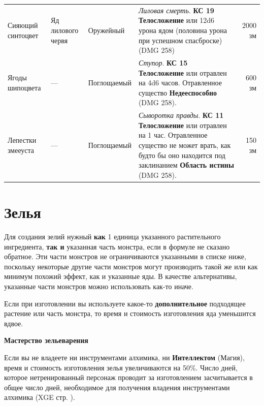 \documentclass[a4paper, 9pt, twocolumn]{book}
\newenvironment {dndtable}
{
		\bigskip
		\centering
		\begin{tcolorbox}
			[enhanced, 
			sharp corners,
			colback=framecolor, 
			boxrule = 0pt, 
			overlay={
				\begin{tcbinvclipframe}
					\path[fill=black] ([xshift=10pt,yshift=7pt]frame.north west) --
					(frame.north west) --
					(frame.north east) --
					([xshift=-10pt, yshift=7pt]frame.north east) --
					([xshift=-10pt, yshift=2pt]frame.north east) --
					([xshift=10pt,yshift=2pt]frame.north west) -- cycle;
					
					\path[fill=black] ([xshift=10pt,yshift=-7pt]frame.south west) --
					(frame.south west) --
					(frame.south east) --
					([xshift=-10pt, yshift=-7pt]frame.south east) --
					([xshift=-10pt, yshift=-2pt]frame.south east) --
					([xshift=10pt,yshift=-2pt]frame.south west) -- cycle;
				\end{tcbinvclipframe}
			}
			]}
{\end{tcolorbox}}
\begin{document}
\begin{table}[H]
\begin{tabularx}{\linewidth}{Q W W X R}
			Сияющий синтоцвет & Яд лилового червя & Оружейный & \textit{Лиловая смерть}. \textbf{КС 19 Телосложение} или 12d6 урона ядом (половина урона при успешном спасброске) (DMG 258) & 2000 зм \\
			
			Ягоды шипоцвета & --- & Поглощаемый & \textit{Ступор}. \textbf{КС 15 Телосложение} или отравлен на 4d6 часов. Отравленное существо \textbf{Недееспособно} (DMG 258). & 600 зм \\
			
			Лепестки змееуста & --- & Поглощаемый & \textit{Сыворотка правды}. \textbf{КС 11 Телосложение} или отравлен на 1 час. Отравленное существо не может врать, как будто бы оно находится под заклинанием \textbf{Область истины} (DMG 258). & 150 зм \\
		\end{tabularx}
	\end{table}


	
		
	


	\section{Зелья}
	
	
	
	Для создания зелий нужный \textbf{как} 1 единица указанного растительного ингредиента, \textbf{так и} указанная часть монстра, если в формуле не сказано обратное. Эти части монстров не ограничиваются указанными в списке ниже, поскольку некоторые другие части монстров могут производить такой же или как минимум похожий эффект, как и указанные яды. В качестве альтернативы, указанные части монстров можно использовать как-то иначе.
	
	Если при изготовлении вы используете какое-то \textbf{дополнительное} подходящее растение или часть монстра, то время и стоимость  изготовления яда уменьшится вдвое. 
	
	\begin{dndtable}
		{\Large \textbf{Мастерство зельеварения}}
		
		Если вы не владеете ни инструментами алхимика, ни \textbf{Интеллектом} (Магия), время и стоимость изготовления зелья увеличиваются на 50\%. Число дней, которое нетренированный персонаж проводит за изготовлением засчитывается в общее число дней, необходимое для получения владения инструментами алхимика (XGE стр. ). %
	\end{dndtable}
\end{document}
